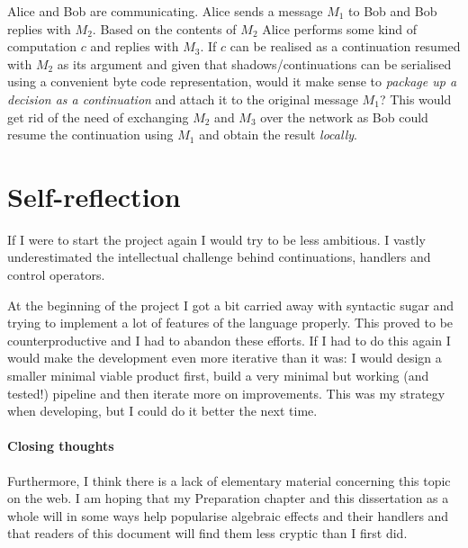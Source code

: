 \documentclass[class=article, crop=false]{standalone}
\begin{document}
Alice and Bob are communicating. Alice sends a message $M_1$ to Bob and Bob
replies with $M_2$. Based on the contents of $M_2$ Alice performs some kind of
computation $c$ and replies with $M_3$. If $c$ can be realised as a continuation
resumed with $M_2$ as its argument and given that shadows/continuations can be
serialised using a convenient byte code representation, would it make sense to
\emph{package up a decision as a continuation} and attach it to the original
message $M_1$? This would get rid of the need of exchanging $M_2$ and $M_3$
over the network as Bob could resume the continuation using $M_1$ and obtain
the result \emph{locally}.


\section{Self-reflection}

If I were to start the project again I would try to be less ambitious. I vastly
underestimated the intellectual challenge behind continuations, handlers and
control operators.

At the beginning of the project I got a bit carried away with syntactic sugar
and trying to implement a lot of features of the language properly. This proved
to be counterproductive and I had to abandon these efforts. If I had to do this
again I would make the development even more iterative than it was: I would
design a smaller minimal viable product first, build a very minimal but working
(and tested!) pipeline and then iterate more on improvements. This was my
strategy when developing, but I could do it better the next time.

\paragraph{Closing thoughts}

Furthermore, I think there is a lack of elementary material concerning this
topic on the web. I am hoping that my Preparation chapter and this dissertation
as a whole will in some ways help popularise algebraic effects and their
handlers and that readers of this document will find them less cryptic than I
first did.
\end{document}
